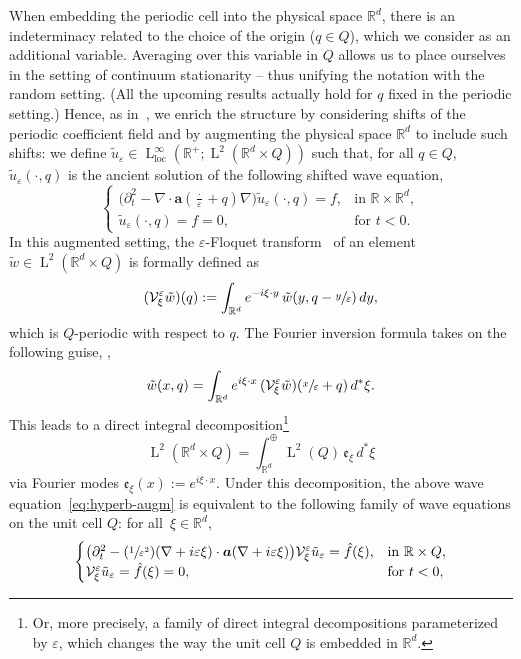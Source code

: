 \documentclass[10pt]{amsart}
\newcommand{\Psfrac}[2]{(\sfrac{#1}{#2})}
\theoremstyle{plain}
\theoremstyle{definition}
\numberwithin{equation}{section}
\newcommand{\e}{\varepsilon}
\newcommand{\Vc}{\mathcal V}
\newcommand{\R}{\mathbb R}
\newcommand{\loc}{{\operatorname{loc}}}
\newcommand{\Aa}{\boldsymbol a}
\newcommand{\Ld}{\operatorname{L}}
\begin{document}
{When embedding the periodic cell into the physical space $\R^d$, there is an indeterminacy related to the choice of the origin ($q \in Q$), which we consider as an additional variable. Averaging over this variable in $Q$ allows us to place ourselves in the setting of continuum stationarity -- thus unifying the notation with the random setting. (All the upcoming results actually hold for $q$ fixed in the periodic setting.)
Hence, as in~\cite{BG,DGS,DS1}, we enrich} the structure by considering shifts of the periodic coefficient field and by augmenting the physical space $\R^d$ to include such shifts: we define $\tilde u_\e\in\Ld^\infty_\loc(\R^+;\Ld^2(\R^d\times Q))$ such that, for all $q\in Q$, $\tilde u_\e(\cdot,q)$ is the ancient solution of the following shifted wave equation,
\begin{equation}\label{eq:hyperb-augm}
\begin{cases}
\big(\partial_t^2-\nabla\cdot\Aa(\tfrac\cdot\e+q)\nabla\big)\tilde u_\e(\cdot,q)=f,&\text{in $\R\times\R^d$},\\
\tilde u_\e(\cdot,q)=f=0,&\text{for $t<0$}.
\end{cases}
\end{equation}
In this augmented setting, the $\e$-Floquet transform~\cite{DGS,DS1} of an element $\tilde w\!\in\!\Ld^2(\R^d\!\times\! Q)$ is formally defined as
\[(\Vc_\xi^\e\tilde w)(q):=\int_{\R^d}e^{-i\xi\cdot y}\,\tilde w(y,q-\sfrac y\e)\,dy,\]
which is $Q$-periodic with respect to $q$. The Fourier inversion formula takes on the following guise, \cf \cite[Lem.\,2.2]{DGS},
\begin{equation}\label{eq:invert-Floquet}
\tilde w(x,q)=\int_{\R^d}e^{i\xi\cdot x}\,(\Vc_\xi^\e \tilde w)(\sfrac x\e+q)\,d^* \xi.
\end{equation}
This leads to a direct integral decomposition\footnote{Or, more precisely, a family of direct integral decompositions parameterized by $\e$, which changes the way the unit cell $Q$ is embedded in $\R^d$.}
\[\Ld^2(\R^d\times Q)=\int_{\R^d}^\oplus\Ld^2( Q)\,\mathfrak e_\xi\,d^*\xi\]
via Fourier modes $\mathfrak e_\xi(x):=e^{i\xi\cdot x}$.
Under this decomposition, the above wave equation~\eqref{eq:hyperb-augm} is equivalent to the following family of wave equations on the unit cell $Q${:} for all~$\xi\in\R^d$,
\begin{equation*}
\begin{cases}
\big(\partial_t^2-\Psfrac1{\e^2}(\nabla+i\e\xi)\cdot\Aa(\nabla+i\e\xi)\big)\Vc_\xi^\e\tilde u_\e=\hat f(\xi),&\text{in $\R\times Q$},\\
\Vc_\xi^\e\tilde u_\e=\hat f(\xi)=0,&\text{for $t<0$},
\end{cases}
\end{equation*}
\end{document}
